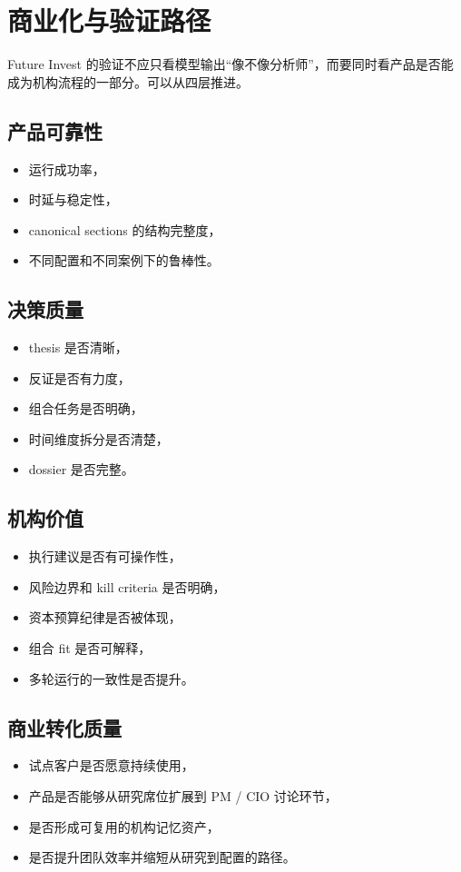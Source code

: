 \documentclass[11pt]{article}
\begin{document}
\section{商业化与验证路径}

Future Invest 的验证不应只看模型输出“像不像分析师”，而要同时看产品是否能成为机构流程的一部分。可以从四层推进。

\subsection{产品可靠性}
\begin{itemize}
\item 运行成功率，
\item 时延与稳定性，
\item canonical sections 的结构完整度，
\item 不同配置和不同案例下的鲁棒性。
\end{itemize}

\subsection{决策质量}
\begin{itemize}
\item thesis 是否清晰，
\item 反证是否有力度，
\item 组合任务是否明确，
\item 时间维度拆分是否清楚，
\item dossier 是否完整。
\end{itemize}

\subsection{机构价值}
\begin{itemize}
\item 执行建议是否有可操作性，
\item 风险边界和 kill criteria 是否明确，
\item 资本预算纪律是否被体现，
\item 组合 fit 是否可解释，
\item 多轮运行的一致性是否提升。
\end{itemize}

\subsection{商业转化质量}
\begin{itemize}
\item 试点客户是否愿意持续使用，
\item 产品是否能够从研究席位扩展到 PM / CIO 讨论环节，
\item 是否形成可复用的机构记忆资产，
\item 是否提升团队效率并缩短从研究到配置的路径。
\end{itemize}
\end{document}
